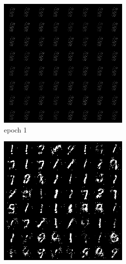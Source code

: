 \documentclass[a4paper]{article}
\theoremstyle{definition}
\newenvironment{soln}{
	\leavevmode\color{blue}\ignorespaces
}{}
\begin{document}
\begin{enumerate} [label=(\alph*)]
\begin{soln}
			\begin{figure}[H]
				\centering
				\begin{subfigure}[b]{0.3\textwidth}
					\centering
					\includegraphics[width=\textwidth]{../figs/opt_gen_img1.png}
					\caption{epoch 1}
				\end{subfigure}
				\hfill
				\begin{subfigure}[b]{0.3\textwidth}
					\centering
					\includegraphics[width=\textwidth]{../figs/opt_gen_img50.png}

\end{subfigure}
\end{figure}
\end{soln}
\end{enumerate}
\end{document}
